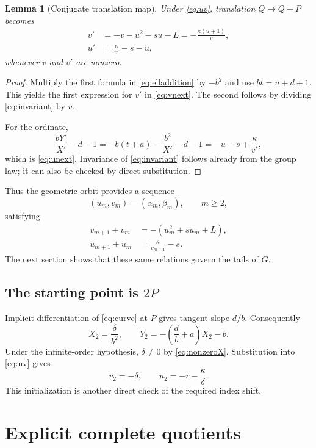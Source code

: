 \documentclass[11pt,letterpaper]{article}
\numberwithin{equation}{section}
\newtheorem{lemma}[theorem]{Lemma}
\theoremstyle{definition}
\theoremstyle{remark}
\begin{document}
\begin{lemma}[Conjugate translation map]\label{lem:map}
Under \eqref{eq:uv}, translation $Q\mapsto Q+P$ becomes
\begin{align}
 v'&=-v-u^2-su-L=-\frac{\kappa(u+1)}{v},\label{eq:vnext}\\
 u'&=\frac{\kappa}{v'}-s-u,\label{eq:unext}
\end{align}
whenever $v$ and $v'$ are nonzero.
\end{lemma}
\begin{proof}
Multiply the first formula in \eqref{eq:elladdition} by $-b^2$ and use
$b t=u+d+1$. This yields the first expression for $v'$ in
\eqref{eq:vnext}. The second follows by dividing
\eqref{eq:invariant} by $v$.

For the ordinate,
\[
 \frac{bY'}{X'}-d-1
 =-b(t+a)-\frac{b^2}{X'}-d-1
 =-u-s+\frac{\kappa}{v'},
\]
which is \eqref{eq:unext}. Invariance of \eqref{eq:invariant} follows
already from the group law; it can also be checked by direct substitution.
\end{proof}

Thus the geometric orbit provides a sequence
\[
 (u_m,v_m)=(\alpha_m,\beta_m),\qquad m\ge2,
\]
satisfying
\begin{align}
 v_{m+1}+v_m&=-(u_m^2+su_m+L),\label{eq:sumv}\\
 u_{m+1}+u_m&=\frac{\kappa}{v_{m+1}}-s.\label{eq:sumu}
\end{align}
The next section shows that these same relations govern the tails of $G$.

\subsection{The starting point is \texorpdfstring{$2P$}{2P}}
Implicit differentiation of \eqref{eq:curve} at $P$ gives tangent slope
$d/b$. Consequently
\begin{equation}\label{eq:2P}
 X_2=\frac{\delta}{b^2},\qquad
 Y_2=-\left(\frac db+a\right)X_2-b.
\end{equation}
Under the infinite-order hypothesis, $\delta\ne0$ by
\eqref{eq:nonzeroX}. Substitution into \eqref{eq:uv} gives
\begin{equation}\label{eq:initialuv}
 v_2=-\delta,\qquad u_2=-r-\frac{\kappa}{\delta}.
\end{equation}
This initialization is another direct check of the required index shift.

\section{Explicit complete quotients}\label{sec:tails}
\end{document}
